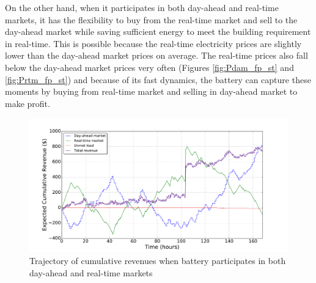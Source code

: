 \documentclass[11pt,twoside]{article}
\begin{document}
On the other hand, when it participates in both day-ahead and real-time markets, it has the flexibility to buy from the real-time market and sell to the day-ahead market while saving sufficient energy to meet the building requirement in real-time. This is possible because the real-time electricity prices are slightly lower than the day-ahead market prices on average. The real-time prices also fall below the day-ahead market prices very often (Figures \ref{fig:Pdam_fp_st} and \ref{fig:Prtm_fp_st}) and because of its fast dynamics, the battery can capture these moments by buying from real-time market and selling in day-ahead market to make profit. 

\begin{figure}[h!]
\begin{center}
\includegraphics[scale=0.4]{Figures/Plots/fullproblem_stoch/cumulative_rev_fp_st.pdf} \caption{Trajectory of cumulative revenues when battery participates in both day-ahead and real-time markets}\label{fig:cumulative_rev_fp_st}\end{center}
\end{figure}
\end{document}
